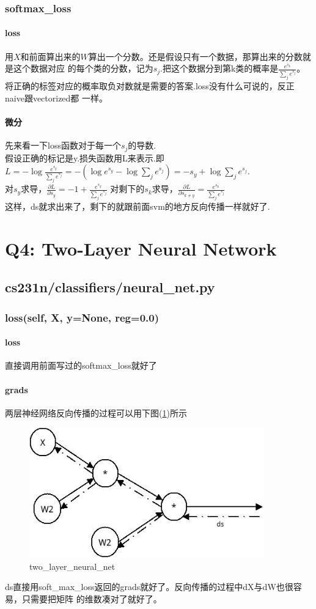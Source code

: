 \documentclass[fontset = none]{ctexart}
\begin{document}
\subsubsection{softmax\_loss}
\paragraph{loss}
用$X$和前面算出来的$W$算出一个分数。还是假设只有一个数据，那算出来的分数就是这个数据对应
的每个类的分数，记为$s_j$.把这个数据分到第k类的概率是$\frac{e^{s_k}}{\sum_j{e^{s_j}}}$。
将正确的标签对应的概率取负对数就是需要的答案.loss没有什么可说的，反正naive跟vectorized都
一样。
\paragraph{微分}
先来看一下loss函数对于每一个$s_j$的导数.\\
假设正确的标记是y.损失函数用L来表示.即$L=-\log{\frac{e^{s_y}}{\sum_j{e^{s_j}}}}=
-(\log{e^{s_y}} - \log{\sum_j e^{s_j}}) = -s_y + \log{\sum_j e^{s_j}}$.\\
对$s_y$求导，$\frac{\partial L}{\partial s_y}=-1+\frac{e^{s_y}}{\sum_j{e^{s_j}}}$
对剩下的$s_k$求导，$\frac{\partial L}{\partial s_{k \neq y}} =
\frac{e^{s_k}}{\sum_j{e^{s_j}}}$\\
这样，ds就求出来了，剩下的就跟前面svm的地方反向传播一样就好了.
\section{Q4: Two-Layer Neural Network}

\subsection{cs231n/classifiers/neural\_net.py}
\subsubsection{loss(self, X, y=None, reg=0.0)}

\paragraph{loss}
直接调用前面写过的softmax\_loss就好了
\paragraph{grads}
两层神经网络反向传播的过程可以用下图(\ref{fig:two_layer_neural_net})所示

\begin{figure}[h]
  \includegraphics[width=4in]{./assignment1_pic/neural_net.jpg}
  \caption{two\_layer\_neural\_net}
  \label{fig:two_layer_neural_net}
\end{figure}

ds直接用soft\_max\_loss返回的grads就好了。反向传播的过程中dX与dW也很容易，只需要把矩阵
的维数凑对了就好了。
\end{document}
